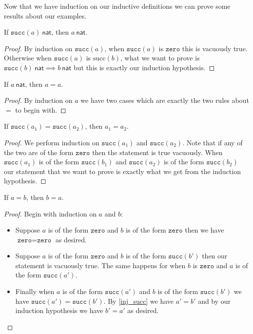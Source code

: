 Now that we have induction on our inductive definitions we can prove some results about our examples.

\begin{lemma}
    If $\texttt{succ}(a)\ \mathsf{nat}$, then $a\ \mathsf{nat}$.
\end{lemma}

\begin{proof}
    By induction on $\texttt{succ}(a)$, when $\texttt{succ}(a)$ is $\texttt{zero}$ this is vacuously true. Otherwise when $\texttt{succ}(a)$ is $\text{succ}(b)$, what we want to prove is $\texttt{succ}(b)\ \mathsf{nat} \implies b\ \mathsf{nat}$ but this is exactly our induction hypothesis.
\end{proof}


\begin{lemma}[Reflexivity of $=$]
    If $a\ \mathsf{nat}$, then $a = a$.
\end{lemma}

\begin{proof}
    By induction on $a$ we have two cases which are exactly the two rules about $=$ to begin with.
\end{proof}


\begin{lemma}\label{inj_succ}
    If $\texttt{succ}(a_1) = \texttt{succ}(a_2)$, then $a_1 = a_2$.
\end{lemma}

\begin{proof}
    We perform induction on $\texttt{succ}(a_1)$ and $\texttt{succ}(a_2)$. Note that if any of the two are of the form $\texttt{zero}$ then the statement is true vacuously. When $\texttt{succ}(a_1)$ is of the form $\texttt{succ}(b_1)$ and $\texttt{succ}(a_2)$ is of the form $\texttt{succ}(b_2)$ our statement that we want to prove is exactly what we get from the induction hypothesis.
\end{proof}


\begin{lemma}[Symmetry of $=$]
    If $a = b$, then $b = a$.
\end{lemma}

\begin{proof}
    Begin with induction on $a$ and $b$:
    \begin{itemize}
        \item Suppose $a$ is of the form $\texttt{zero}$ and $b$ is of the form $\texttt{zero}$ then we have $\texttt{zero} = \texttt{zero}$ as desired.
        \item Suppose $a$ is of the form $\texttt{zero}$ and $b$ is of the form $\texttt{succ}(b')$ then our statement is vacuously true. The same happens for when $b$ is $\texttt{zero}$ and $a$ is of the form $\texttt{succ}(a')$.
        \item Finally when $a$ is of the form $\texttt{succ}(a')$ and $b$ is of the form $\texttt{succ}(b')$ we have $\texttt{succ}(a')= \texttt{succ}(b')$. By \ref{inj_succ} we have $a'=b'$ and by our induction hypothesis we have $b' = a'$ as desired.
    \end{itemize}
\end{proof}


